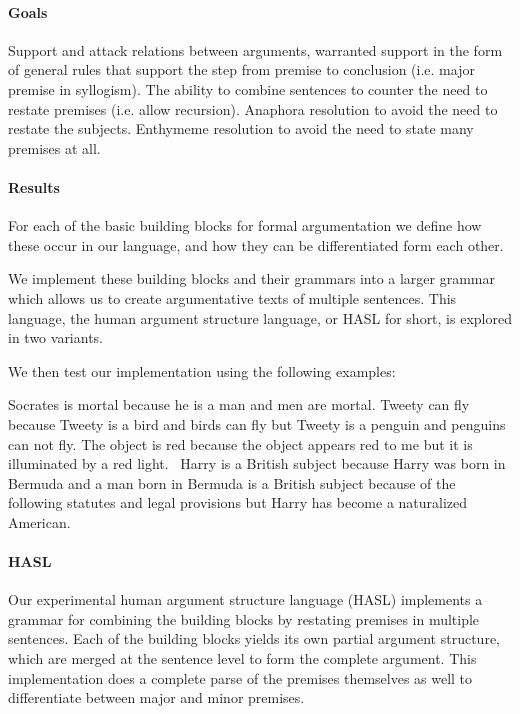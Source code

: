 \documentclass{IOS-Book-Article}
\begin{document}
\paragraph{Goals}
Support and attack relations between arguments, warranted support in the form of general rules that support the step from premise to conclusion (i.e. major premise in syllogism). The ability to combine sentences to counter the need to restate premises (i.e. allow recursion). Anaphora resolution to avoid the need to restate the subjects. Enthymeme resolution to avoid the need to state many premises at all. 

\paragraph{Results}
For each of the basic building blocks for formal argumentation we define how these occur in our language, and how they can be differentiated form each other.

We implement these building blocks and their grammars into a larger grammar which allows us to create argumentative texts of multiple sentences. This language, the human argument structure language, or HASL for short, is explored in two variants.

We then test our implementation using the following examples:
\begin{exe}
	\ex\label{ex:socrates} Socrates is mortal because he is a man and men are mortal.
	\ex\label{ex:tweety} Tweety can fly because Tweety is a bird and birds can fly but Tweety is a penguin and penguins can not fly.
	\ex\label{ex:light} The object is red because the object appears red to me but it is illuminated by a red light.~\cite{pollock1987}
	\ex\label{ex:toulmin} Harry is a British subject because Harry was born in Bermuda and a man born in Bermuda is a British subject because of the following statutes and legal provisions but Harry has become a naturalized American.~\cite{toulmin1958}
\end{exe}

\paragraph{HASL}
Our experimental human argument structure language (HASL) implements a grammar for combining the building blocks by restating premises in multiple sentences. Each of the building blocks yields its own partial argument structure, which are merged at the sentence level to form the complete argument. This implementation does a complete parse of the premises themselves as well to differentiate between major and minor premises.
\end{document}
